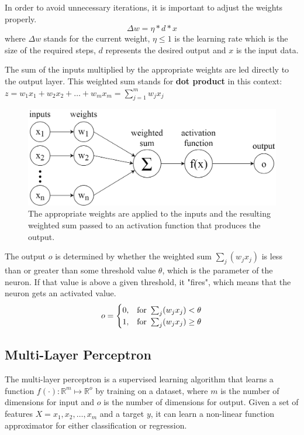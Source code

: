 In order to avoid unnecessary iterations, it is important to adjust the weights properly.
$$ \Delta w = \eta * d * x $$
where $\Delta w$ stands for the current weight, $\eta \leq 1$ is the learning rate which is the size of the required steps, $d$ represents the desired output and $x$ is the input data.\medskip

The sum of the inputs multiplied by the appropriate weights are led directly to the output layer. This weighted sum stands for \textbf{dot product} in this context: $ z = w_1 x_1 + w_2 x_2 + \dots + w_m x_m = \sum_{j=1}^m w_j x_j $

\begin{figure}[h]
	\centering
	\includegraphics[height=0.28\linewidth]{./figures/perceptron}
	\caption{The appropriate weights are applied to the inputs and the resulting weighted sum passed to an activation function that produces the output.}
	\label{fig:perceptron}
\end{figure}

The output $o$ is determined by whether the weighted sum $\sum_j(w_j x_j)$ is less than or greater than some threshold value $\theta$, which is the parameter of the neuron. If that value is above a given threshold, it "fires", which means that the neuron gets an activated value. 
$$ o = \begin{cases} 0, & \hbox{for}~ \sum_j(w_j x_j) < \theta \\ 1, & \hbox{for}~ \sum_j(w_j x_j) \geq \theta \end{cases} $$



\subsection{Multi-Layer Perceptron}

The multi-layer perceptron is a supervised learning algorithm that learns a function $f(\cdot) : \mathbb{R}^m \mapsto \mathbb{R}^o$ by training on a dataset, where $m$ is the number of dimensions for input and $o$ is the number of dimensions for output. Given a set of features $X = x_1, x_2, \dots, x_m$ and a target $y$, it can learn a non-linear function approximator for either classification or regression. \medskip

